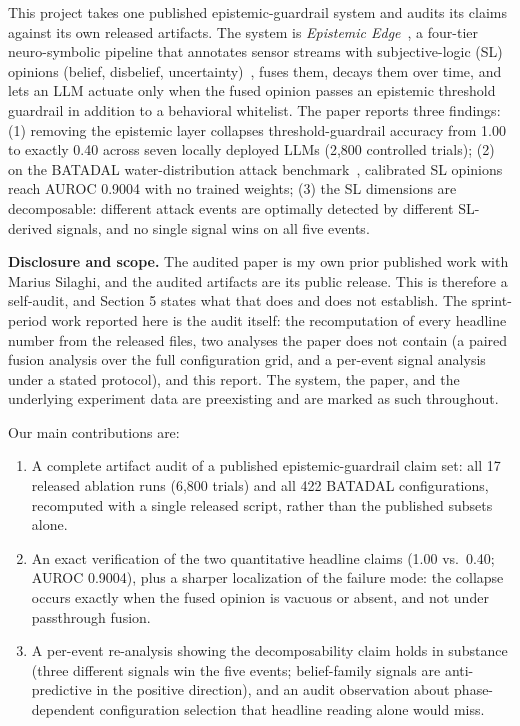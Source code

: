 \documentclass[11pt]{article}
\begin{document}
This project takes one published epistemic-guardrail system and audits its claims against its own released artifacts. The system is \textit{Epistemic Edge}~\cite{syed2026epistemic}, a four-tier neuro-symbolic pipeline that annotates sensor streams with subjective-logic (SL) opinions (belief, disbelief, uncertainty)~\cite{josang2016}, fuses them, decays them over time, and lets an LLM actuate only when the fused opinion passes an epistemic threshold guardrail in addition to a behavioral whitelist. The paper reports three findings: (1) removing the epistemic layer collapses threshold-guardrail accuracy from 1.00 to exactly 0.40 across seven locally deployed LLMs (2,800 controlled trials); (2) on the BATADAL water-distribution attack benchmark~\cite{taormina2018}, calibrated SL opinions reach AUROC 0.9004 with no trained weights; (3) the SL dimensions are decomposable: different attack events are optimally detected by different SL-derived signals, and no single signal wins on all five events.

\textbf{Disclosure and scope.} The audited paper is my own prior published work with Marius Silaghi, and the audited artifacts are its public release. This is therefore a self-audit, and Section 5 states what that does and does not establish. The sprint-period work reported here is the audit itself: the recomputation of every headline number from the released files, two analyses the paper does not contain (a paired fusion analysis over the full configuration grid, and a per-event signal analysis under a stated protocol), and this report. The system, the paper, and the underlying experiment data are preexisting and are marked as such throughout.

Our main contributions are:
\begin{enumerate}[leftmargin=*,itemsep=1pt]
\item A complete artifact audit of a published epistemic-guardrail claim set: all 17 released ablation runs (6,800 trials) and all 422 BATADAL configurations, recomputed with a single released script, rather than the published subsets alone.
\item An exact verification of the two quantitative headline claims (1.00 vs.\ 0.40; AUROC 0.9004), plus a sharper localization of the failure mode: the collapse occurs exactly when the fused opinion is vacuous or absent, and not under passthrough fusion.
\item A per-event re-analysis showing the decomposability claim holds in substance (three different signals win the five events; belief-family signals are anti-predictive in the positive direction), and an audit observation about phase-dependent configuration selection that headline reading alone would miss.
\end{enumerate}
\end{document}
